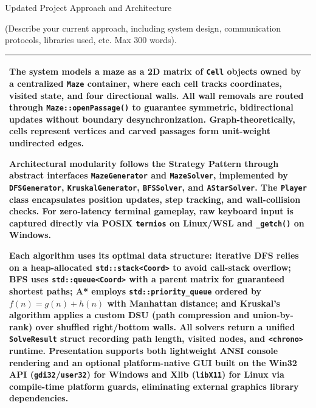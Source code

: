 \documentclass[12pt,a4paper]{article}
\newcommand{\secthead}[2]{%
  {\fontsize{18}{21.9}\selectfont\color{geheading}#1\par}\vspace{1.6pt}%
  {\fontsize{10.5}{14.5}\selectfont\color{gehint}#2\par}%
  \vspace{\secgap}}
\newlength{\secgap}\setlength{\secgap}{5.7pt}
\newcommand{\afterbox}{\vspace{\aftergap}}
\newlength{\aftergap}\setlength{\aftergap}{12pt}
\newenvironment{answerbox}{%
  \noindent\begin{tabular}{|p{\dimexpr\textwidth-2\tabcolsep-2\arrayrulewidth\relax}|}\hline
  \fontsize{10.8}{13.3}\selectfont\setlength{\parskip}{3.5pt}\rule{0pt}{18pt}\ignorespaces}{%
  \rule[-11pt]{0pt}{0pt}\\\hline\end{tabular}\par}
\begin{document}
\afterbox

\secthead{Updated Project Approach and Architecture }{(Describe your current approach, including system design, communication protocols, libraries used, etc. Max 300 words).}

\begin{answerbox}
The system models a maze as a 2D matrix of \texttt{Cell} objects owned by a centralized \texttt{Maze} container, where each cell tracks coordinates, visited state, and four directional walls. All wall removals are routed through \texttt{Maze::openPassage()} to guarantee symmetric, bidirectional updates without boundary desynchronization. Graph-theoretically, cells represent vertices and carved passages form unit-weight undirected edges.\par\vspace{2pt}
Architectural modularity follows the Strategy Pattern through abstract interfaces \texttt{MazeGenerator} and \texttt{MazeSolver}, implemented by \texttt{DFSGenerator}, \texttt{KruskalGenerator}, \texttt{BFSSolver}, and \texttt{AStarSolver}. The \texttt{Player} class encapsulates position updates, step tracking, and wall-collision checks. For zero-latency terminal gameplay, raw keyboard input is captured directly via POSIX \texttt{termios} on Linux/WSL and \texttt{\_getch()} on Windows.\par\vspace{2pt}
Each algorithm uses its optimal data structure: iterative DFS relies on a heap-allocated \texttt{std::stack<Coord>} to avoid call-stack overflow; BFS uses \texttt{std::queue<Coord>} with a parent matrix for guaranteed shortest paths; A* employs \texttt{std::priority\_queue} ordered by $f(n) = g(n) + h(n)$ with Manhattan distance; and Kruskal's algorithm applies a custom DSU (path compression and union-by-rank) over shuffled right/bottom walls. All solvers return a unified \texttt{SolveResult} struct recording path length, visited nodes, and \texttt{<chrono>} runtime. Presentation supports both lightweight ANSI console rendering and an optional platform-native GUI built on the Win32 API (\texttt{gdi32}/\texttt{user32}) for Windows and Xlib (\texttt{libX11}) for Linux via compile-time platform guards, eliminating external graphics library dependencies.
\end{answerbox}

\newpage

\end{document}
